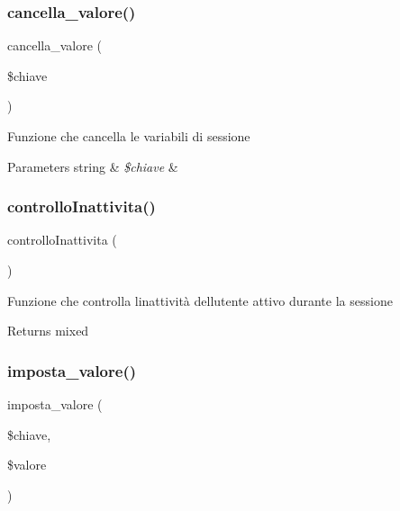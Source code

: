 \subsubsection{\texorpdfstring{cancella\+\_\+valore()}{cancella\_valore()}}
{\footnotesize\ttfamily cancella\+\_\+valore (\begin{DoxyParamCaption}\item[{}]{\$chiave }\end{DoxyParamCaption})}

Funzione che cancella le variabili di sessione


\begin{DoxyParams}[1]{Parameters}
string & {\em \$chiave} & \\
\hline
\end{DoxyParams}
\mbox{\label{class_u_session_aeb1ca2b1ac871af9a4b44b2d49202f78}} 
\subsubsection{\texorpdfstring{controllo\+Inattivita()}{controlloInattivita()}}
{\footnotesize\ttfamily controllo\+Inattivita (\begin{DoxyParamCaption}{ }\end{DoxyParamCaption})}

Funzione che controlla l\textquotesingle{}inattività dell\textquotesingle{}utente attivo durante la sessione

\begin{DoxyReturn}{Returns}
mixed 
\end{DoxyReturn}
\mbox{\label{class_u_session_a0d6c0a123140c7d2ab3c05ce426365ae}} 
\subsubsection{\texorpdfstring{imposta\+\_\+valore()}{imposta\_valore()}}
{\footnotesize\ttfamily imposta\+\_\+valore (\begin{DoxyParamCaption}\item[{}]{\$chiave,  }\item[{}]{\$valore }\end{DoxyParamCaption})}

